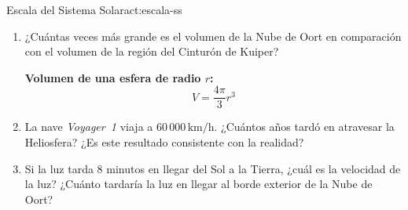 \begin{actividad}{Escala del Sistema Solar}{act:escala-ss}
\begin{enumerate}[leftmargin=1.5em, label=\arabic*.]
        \item ¿Cuántas veces más grande es el volumen de la Nube de Oort en
              comparación con el volumen de la región del Cinturón de Kuiper?

              \begin{destacado}
                  \textbf{Volumen de una esfera de radio $r$:}
                  \[
                      V = \frac{4\pi}{3}r^3
                  \]
              \end{destacado}

        \item La nave \textit{Voyager~1} viaja a $60\,000\,\text{km/h}$.
              ¿Cuántos años tardó en atravesar la Heliosfera? ¿Es este resultado
              consistente con la realidad?

        \item Si la luz tarda 8 minutos en llegar del Sol a la Tierra, ¿cuál es
              la velocidad de la luz? ¿Cuánto tardaría la luz en llegar al borde
              exterior de la Nube de Oort?

    \end{enumerate}
\end{actividad}
